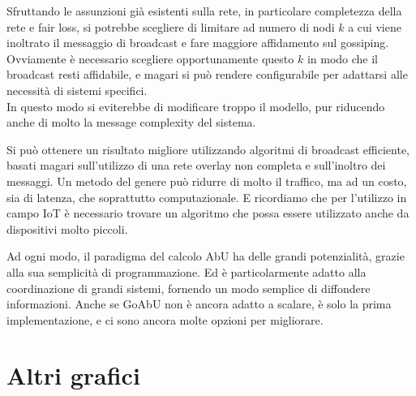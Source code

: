 \documentclass[target=bach]{thud}
\begin{document}
Sfruttando le assunzioni già esistenti sulla rete, in particolare completezza della rete e fair loss, si potrebbe scegliere di limitare ad numero di nodi $k$ a cui viene inoltrato il messaggio di broadcast e fare maggiore affidamento sul gossiping.
Ovviamente è necessario scegliere opportunamente questo $k$ in modo che il broadcast resti affidabile, e magari si può rendere configurabile per adattarsi alle necessità di sistemi specifici.\\
In questo modo si eviterebbe di modificare troppo il modello, pur riducendo anche di molto la message complexity del sistema.

Si può ottenere un risultato migliore utilizzando algoritmi di broadcast efficiente, basati magari sull'utilizzo di una rete overlay non completa e sull'inoltro dei messaggi.
Un metodo del genere può ridurre di molto il traffico, ma ad un costo, sia di latenza, che soprattutto computazionale. E ricordiamo che per l'utilizzo in campo IoT è necessario trovare un algoritmo che possa essere utilizzato anche da dispositivi molto piccoli.

Ad ogni modo, il paradigma del calcolo AbU ha delle grandi potenzialità, grazie alla sua semplicità di programmazione. Ed è particolarmente adatto alla coordinazione di grandi sistemi, fornendo un modo semplice di diffondere informazioni.
Anche se GoAbU non è ancora adatto a scalare, è solo la prima implementazione, e ci sono ancora molte opzioni per migliorare.




\appendix


\chapter{Altri grafici}\label{appendix:grafici}
\end{document}
